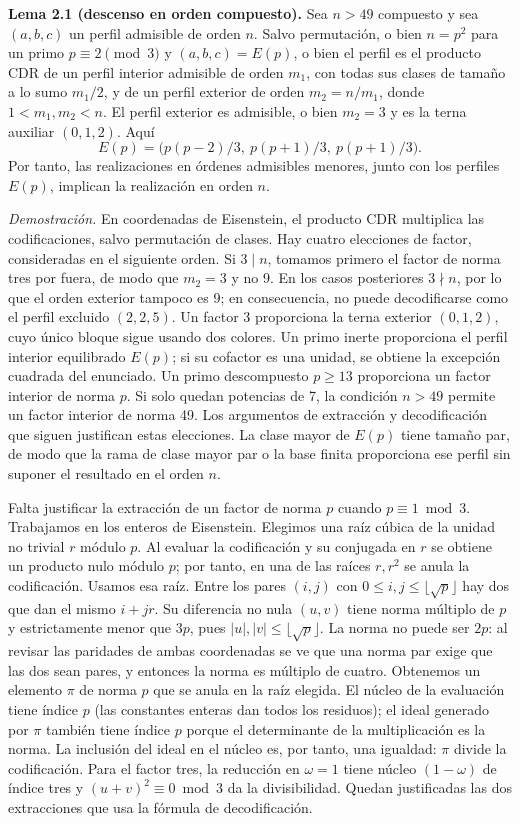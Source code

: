 \documentclass[spanish,11pt,a4paper]{article}
\begin{document}
\textbf{Lema 2.1 (descenso en orden compuesto).} Sea \(n>49\) compuesto y sea \((a,b,c)\) un perfil admisible de orden \(n\). Salvo permutación, o bien \(n=p^2\) para un primo \(p\equiv2\pmod3\) y \((a,b,c)=E(p)\), o bien el perfil es el producto CDR de un perfil interior admisible de orden \(m_1\), con todas sus clases de tamaño a lo sumo \(m_1/2\), y de un perfil exterior de orden \(m_2=n/m_1\), donde \(1<m_1,m_2<n\). El perfil exterior es admisible, o bien \(m_2=3\) y es la terna auxiliar \((0,1,2)\). Aquí \[E(p)=\bigl(p(p-2)/3,\ p(p+1)/3,\ p(p+1)/3\bigr).\] Por tanto, las realizaciones en órdenes admisibles menores, junto con los perfiles \(E(p)\), implican la realización en orden \(n\).

\emph{Demostración.} En coordenadas de Eisenstein, el producto CDR multiplica las codificaciones, salvo permutación de clases. Hay cuatro elecciones de factor, consideradas en el siguiente orden. Si \(3\mid n\), tomamos primero el factor de norma tres por fuera, de modo que \(m_2=3\) y no 9. En los casos posteriores \(3\nmid n\), por lo que el orden exterior tampoco es 9; en consecuencia, no puede decodificarse como el perfil excluido \((2,2,5)\). Un factor 3 proporciona la terna exterior \((0,1,2)\), cuyo único bloque sigue usando dos colores. Un primo inerte proporciona el perfil interior equilibrado \(E(p)\); si su cofactor es una unidad, se obtiene la excepción cuadrada del enunciado. Un primo descompuesto \(p\ge13\) proporciona un factor interior de norma \(p\). Si solo quedan potencias de 7, la condición \(n>49\) permite un factor interior de norma 49. Los argumentos de extracción y decodificación que siguen justifican estas elecciones. La clase mayor de \(E(p)\) tiene tamaño par, de modo que la rama de clase mayor par o la base finita proporciona ese perfil sin suponer el resultado en el orden \(n\).

Falta justificar la extracción de un factor de norma \(p\) cuando \(p\equiv1\bmod3\). Trabajamos en los enteros de Eisenstein. Elegimos una raíz cúbica de la unidad no trivial \(r\) módulo \(p\). Al evaluar la codificación y su conjugada en \(r\) se obtiene un producto nulo módulo \(p\); por tanto, en una de las raíces \(r,r^2\) se anula la codificación. Usamos esa raíz. Entre los pares \((i,j)\) con \(0\le i,j\le\lfloor\sqrt p\rfloor\) hay dos que dan el mismo \(i+jr\). Su diferencia no nula \((u,v)\) tiene norma múltiplo de \(p\) y estrictamente menor que \(3p\), pues \(|u|,|v|\le\lfloor\sqrt p\rfloor\). La norma no puede ser \(2p\): al revisar las paridades de ambas coordenadas se ve que una norma par exige que las dos sean pares, y entonces la norma es múltiplo de cuatro. Obtenemos un elemento \(\pi\) de norma \(p\) que se anula en la raíz elegida. El núcleo de la evaluación tiene índice \(p\) (las constantes enteras dan todos los residuos); el ideal generado por \(\pi\) también tiene índice \(p\) porque el determinante de la multiplicación es la norma. La inclusión del ideal en el núcleo es, por tanto, una igualdad: \(\pi\) divide la codificación. Para el factor tres, la reducción en \(\omega=1\) tiene núcleo \((1-\omega)\) de índice tres y \((u+v)^2\equiv0\bmod3\) da la divisibilidad. Quedan justificadas las dos extracciones que usa la fórmula de decodificación.
\end{document}
